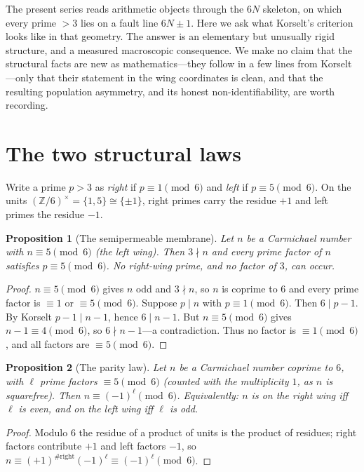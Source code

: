 \documentclass[11pt]{article}
\theoremstyle{plain}
\newtheorem{proposition}{Proposition}
\theoremstyle{definition}
\begin{document}
The present series reads arithmetic objects through the $6N$ skeleton, on which every prime $>3$ lies
on a fault line $6N\pm1$. Here we ask what Korselt's criterion looks like in that geometry. The answer
is an elementary but unusually rigid structure, and a measured macroscopic consequence. We make no
claim that the structural facts are new as mathematics---they follow in a few lines from Korselt---only
that their statement in the wing coordinates is clean, and that the resulting population asymmetry, and
its honest non-identifiability, are worth recording.

\section{The two structural laws}
Write a prime $p>3$ as \emph{right} if $p\equiv1\pmod6$ and \emph{left} if $p\equiv5\pmod6$. On the
units $(\mathbb Z/6)^{\times}=\{1,5\}\cong\{\pm1\}$, right primes carry the residue $+1$ and left
primes the residue $-1$.

\begin{proposition}[The semipermeable membrane]\label{prop:membrane}
Let $n$ be a Carmichael number with $n\equiv5\pmod6$ (the left wing). Then $3\nmid n$ and every prime
factor of $n$ satisfies $p\equiv5\pmod6$. No right-wing prime, and no factor of $3$, can occur.
\end{proposition}

\begin{proof}
$n\equiv5\pmod6$ gives $n$ odd and $3\nmid n$, so $n$ is coprime to $6$ and every prime factor is
$\equiv1$ or $\equiv5\pmod6$. Suppose $p\mid n$ with $p\equiv1\pmod6$. Then $6\mid p-1$. By Korselt
$p-1\mid n-1$, hence $6\mid n-1$. But $n\equiv5\pmod6$ gives $n-1\equiv4\pmod6$, so $6\nmid n-1$---a
contradiction. Thus no factor is $\equiv1\pmod6$, and all factors are $\equiv5\pmod6$.
\end{proof}

\begin{proposition}[The parity law]\label{prop:parity}
Let $n$ be a Carmichael number coprime to $6$, with $\ell$ prime factors $\equiv5\pmod6$ (counted with
the multiplicity $1$, as $n$ is squarefree). Then $n\equiv(-1)^{\ell}\pmod6$. Equivalently: $n$ is on
the right wing iff $\ell$ is even, and on the left wing iff $\ell$ is odd.
\end{proposition}

\begin{proof}
Modulo $6$ the residue of a product of units is the product of residues; right factors contribute $+1$
and left factors $-1$, so $n\equiv(+1)^{\#\text{right}}(-1)^{\ell}\equiv(-1)^{\ell}\pmod6$.
\end{proof}
\end{document}
